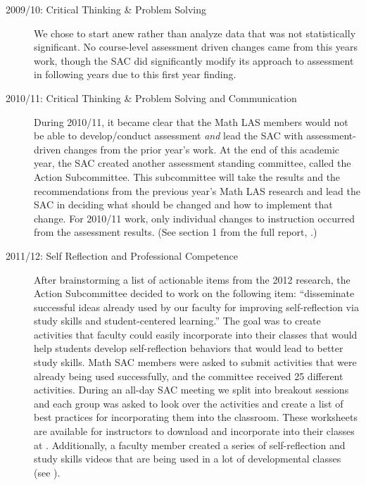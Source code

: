 \begin{description}
	\item[2009/10: Critical Thinking \& Problem Solving]

	We chose to start anew rather than analyze data that was not statistically
	significant.  No course-level assessment driven changes came from this years
	work, though the SAC did significantly modify its approach to assessment in
	following years due to this first year finding.

	\item[2010/11:  Critical Thinking \& Problem Solving and Communication]

	During 2010/11, it became clear that the Math LAS members would not be able to
	develop/conduct assessment \emph{and} lead the SAC with assessment-driven
	changes from the prior year's work.  At the end of this academic year, the SAC
	created another assessment standing committee, called the Action Subcommittee.
	This subcommittee will take the results and the recommendations from the
	previous year's Math LAS research and lead the SAC in deciding what should be
	changed and how to implement that change.  For 2010/11 work, only individual
	changes to instruction occurred from the assessment results.  (See section 1
	from the full report, \cite{annualLASreport2010}.)

	\item[2011/12: Self Reflection and Professional Competence]

	After brainstorming a list of actionable items from the 2012 research, the 
	Action Subcommittee decided to work on the following item: ``disseminate successful ideas
	already used by our faculty for improving self-reflection via study skills and
	student-centered learning.''  The goal was to create activities that faculty
	could easily incorporate into their classes that would help students develop
	self-reflection behaviors that would lead to better study skills.  Math SAC
	members were asked to submit activities that were already being used
	successfully, and the committee received 25 different activities.  During an
	all-day SAC meeting we split into breakout sessions and each group was asked to
	look over the activities and create a list of best practices for incorporating
	them into the classroom. These worksheets are available for instructors to
	download and incorporate into their classes at \cite{selfcenteredlearning}.
	Additionally, a faculty member created a series of self-reflection and study
	skills videos that are being used in a lot of developmental classes (see
	).


\end{description}
